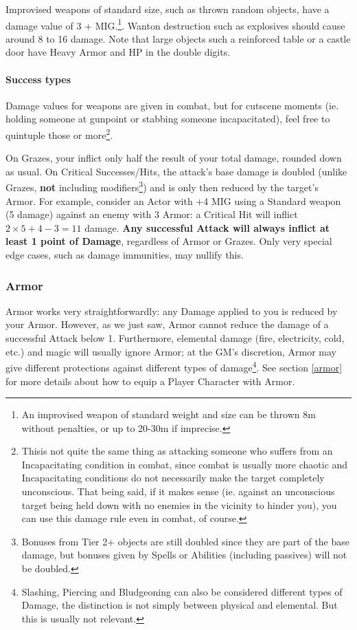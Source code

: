 Improvised weapons of standard size, such as thrown random objects, have a damage value of 3 + MIG.\footnote{An improvised weapon of standard weight and size can be thrown 8m without penalties, or up to 20-30m if imprecise.}. Wanton destruction such as explosives should cause around 8 to 16 damage. Note that large objects such a reinforced table or a castle door have Heavy Armor and HP in the double digits.

\paragraph{Success types}

Damage values for weapons are given in combat, but for cutscene moments (ie. holding someone at gunpoint or stabbing someone incapacitated), feel free to quintuple those or more\footnote{Thisis not quite the same thing as attacking someone who suffers from an Incapacitating condition in combat, since combat is usually more chaotic and Incapacitating conditions do not necessarily make the target completely unconscious. That being said, if it makes sense (ie. against an unconscious target being held down with no enemies in the vicinity to hinder you), you can use this  damage rule even in combat, of course.}.

On Grazes, your inflict only half the result of your total damage, rounded down as usual. On Critical Successes/Hits, the attack's base damage is doubled (unlike Grazes, \textbf{not} including modifiers\footnote{Bonuses from Tier 2+ objects are still doubled since they are part of the base damage, but bonuses given by Spells or Abilities (including passives) will not be doubled.}) and is only then reduced by the target's Armor. For example, consider an Actor with +4 MIG using a Standard weapon (5 damage) against an enemy with 3 Armor: a Critical Hit will inflict $2\times5+4-3 = 11$ damage. \textbf{Any successful Attack will always inflict at least 1 point of Damage}, regardless of Armor or Grazes. Only very special edge cases, such as damage immunities, may nullify this.

\subsubsection{Armor} 

Armor works very straightforwardly: any Damage applied to you is reduced by your Armor. However, as we just saw, Armor cannot reduce the damage of a successful Attack below 1. Furthermore, elemental damage (fire, electricity, cold, etc.) and magic will usually ignore Armor; at the GM's discretion, Armor may give different protections against different types of damage\footnote{Slashing, Piercing and Bludgeoning can also be considered different types of Damage, the distinction is not simply between physical and elemental. But this is usually not relevant.}. See section \ref{armor} for more details about how to equip a Player Character with Armor.

